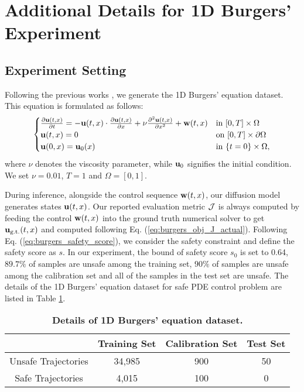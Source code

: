\section{Additional Details for 1D Burgers' Experiment}
\subsection{Experiment Setting}\label{app:1dexp}
Following the previous works \citep{holl2020learning, wei2024generative}, we generate the 1D Burgers' equation dataset. This equation is formulated as follows:
\begin{eqnarray}
\begin{cases}
\label{eq:burgers}
    \frac{\partial \mathbf{u}(t,x)}{\partial t} = -\mathbf{u}(t,x)\cdot \frac{\partial \mathbf{u}(t,x)}{\partial x}+\nu\frac{\partial^2 \mathbf{u}(t,x)}{\partial x^2} + \mathbf{w}(t,x)  &\text{in } [0,T] \times \Omega \\
    \mathbf{u}(t,x) =0  \quad\quad\quad\quad\quad\quad\quad\quad &\text{on } [0,T] \times \partial\Omega    \\
    \mathbf{u}(0,x) = \mathbf{u}_0(x) \quad\quad\quad\quad\quad\quad &\text{in } \{t=0\} \times \Omega,
\end{cases}
\end{eqnarray}
where $\nu$ denotes the viscosity parameter, while $\mathbf{u}_0$ signifies the initial condition. We set $\nu=0.01$, $T=1$ and $\Omega=[0,1]$. 

During inference, alongside the control sequence $\mathbf{w}(t,x)$, our diffusion model generates states $\mathbf{u}(t,x)$. Our reported evaluation metric $\mathcal{J}$ is always computed by feeding the control $\mathbf{w}(t,x)$ into the ground truth numerical solver to get $\mathbf{u}_{\text{g.t.}}(t,x)$ and computed following Eq. (\ref{eq:burgers_obj_J_actual}). Following Eq. (\ref{eq:burgers_safety_score}), we consider the safety constraint and define the safety score as $s$. In our experiment, the bound of safety score $s_0$ is set to 0.64, $89.7\%$ of samples are unsafe among the training set, $90\%$ of samples are unsafe among the calibration set and all of the samples in the test set are unsafe. The details of the 1D Burgers' equation dataset for safe PDE control problem are listed in Table \ref{tab:1d_data}.

\begin{table}[ht]
\centering
\caption{\textbf{Details of 1D Burgers' equation dataset.}}
\begin{tabular}{@{}cccc@{}}
\toprule
                    & Training Set & Calibration Set & Test Set \\ \midrule
Unsafe Trajectories & 34,985       & 900             & 50       \\
Safe Trajectories   & 4,015        & 100             & 0        \\ \bottomrule
\end{tabular}
\label{tab:1d_data}
\end{table}


